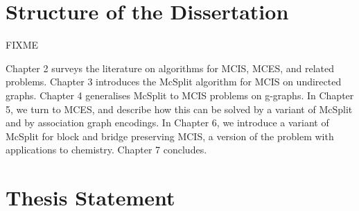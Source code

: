 \section{Structure of the Dissertation}

FIXME

Chapter 2 surveys the literature on algorithms for MCIS, MCES, and related
problems. Chapter 3 introduces the McSplit algorithm for MCIS on undirected
graphs. Chapter 4 generalises McSplit to MCIS problems on g-graphs. In Chapter
5, we turn to MCES, and describe how this can be solved by a variant of McSplit
and by association graph encodings. In Chapter 6, we introduce a variant of
McSplit for block and bridge preserving MCIS, a version of the problem with
applications to chemistry. Chapter 7 concludes.

\section{Thesis Statement}
\label{c:intro:thesisstatement}


